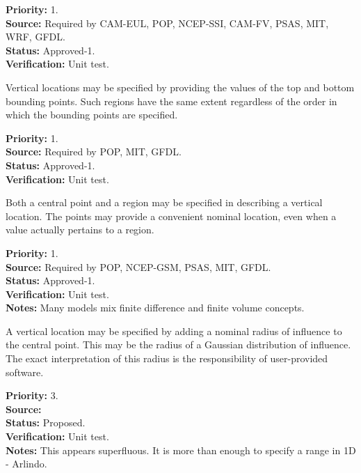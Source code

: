 \begin{reqlist}
{\bf Priority:} 1. \\
{\bf Source:} Required by CAM-EUL, POP, NCEP-SSI,
              CAM-FV, PSAS, MIT, WRF, GFDL. \\
{\bf Status:} Approved-1. \\
{\bf Verification:} Unit test.
\end{reqlist}


Vertical locations may be specified by providing the values of the top and
bottom bounding points.  Such regions have the same extent regardless of the
order in which the bounding points are specified.
\begin{reqlist}
{\bf Priority:} 1. \\
{\bf Source:} Required by POP, MIT, GFDL. \\
{\bf Status:} Approved-1. \\
{\bf Verification:} Unit test.
\end{reqlist}


  Both a central point and a region may be specified in describing a vertical
location.  The points may provide a convenient nominal location, even when
a value actually pertains to a region.
\begin{reqlist}
{\bf Priority:} 1. \\
{\bf Source:} Required by POP, NCEP-GSM, PSAS, MIT, GFDL. \\
{\bf Status:} Approved-1. \\
{\bf Verification:} Unit test.\\
{\bf Notes:} Many models mix finite difference and finite volume concepts.
\end{reqlist}


  A vertical location may be specified by adding a nominal radius of
influence to the central point.  This may be the radius of a Gaussian
distribution of influence. The exact interpretation of this radius is
the responsibility of user-provided software.
\begin{reqlist}
{\bf Priority:} 3. \\
{\bf Source:} \\
{\bf Status:} Proposed. \\
{\bf Verification:} Unit test.\\
{\bf Notes:} This appears superfluous. It is more than enough to specify a range 
in 1D - Arlindo.
\end{reqlist}
 
